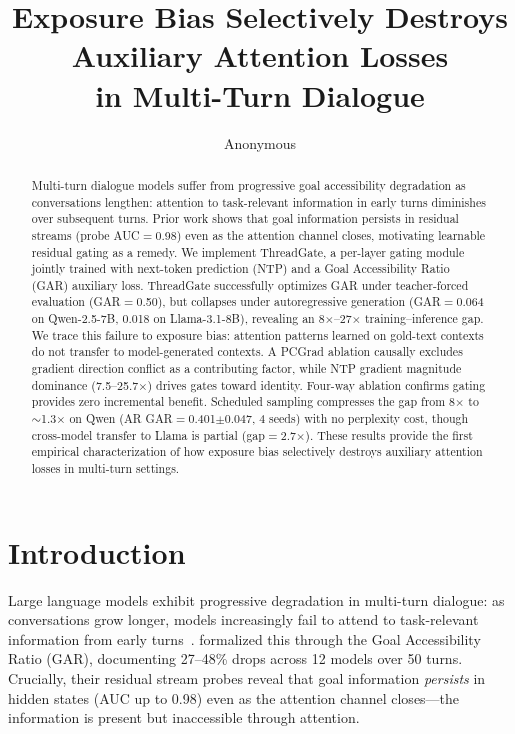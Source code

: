 \documentclass[11pt,a4paper]{article}
\title{Exposure Bias Selectively Destroys Auxiliary Attention Losses\\in Multi-Turn Dialogue}
\author{Anonymous}
\begin{document}
\maketitle

\begin{abstract}
Multi-turn dialogue models suffer from progressive goal accessibility degradation as conversations lengthen: attention to task-relevant information in early turns diminishes over subsequent turns. Prior work shows that goal information persists in residual streams (probe AUC$=$0.98) even as the attention channel closes, motivating learnable residual gating as a remedy. We implement ThreadGate, a per-layer gating module jointly trained with next-token prediction (NTP) and a Goal Accessibility Ratio (GAR) auxiliary loss. ThreadGate successfully optimizes GAR under teacher-forced evaluation (GAR$=$0.50), but collapses under autoregressive generation (GAR$=$0.064 on Qwen-2.5-7B, 0.018 on Llama-3.1-8B), revealing an 8$\times$--27$\times$ training--inference gap. We trace this failure to exposure bias: attention patterns learned on gold-text contexts do not transfer to model-generated contexts. A PCGrad ablation causally excludes gradient direction conflict as a contributing factor, while NTP gradient magnitude dominance (7.5--25.7$\times$) drives gates toward identity. Four-way ablation confirms gating provides zero incremental benefit. Scheduled sampling compresses the gap from 8$\times$ to ${\sim}$1.3$\times$ on Qwen (AR GAR$=$0.401$\pm$0.047, 4 seeds) with no perplexity cost, though cross-model transfer to Llama is partial (gap$=$2.7$\times$). These results provide the first empirical characterization of how exposure bias selectively destroys auxiliary attention losses in multi-turn settings.
\end{abstract}

\section{Introduction}

Large language models exhibit progressive degradation in multi-turn dialogue: as conversations grow longer, models increasingly fail to attend to task-relevant information from early turns~\cite{dongre2026gar,zheng2023judging}. \citet{dongre2026gar} formalized this through the Goal Accessibility Ratio (GAR), documenting 27--48\% drops across 12 models over 50 turns. Crucially, their residual stream probes reveal that goal information \emph{persists} in hidden states (AUC up to 0.98) even as the attention channel closes---the information is present but inaccessible through attention.
\end{document}
